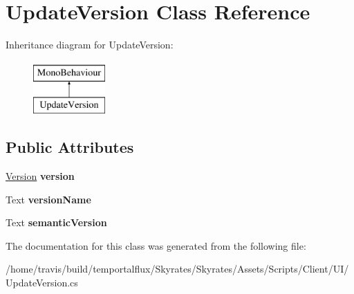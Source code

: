 \hypertarget{class_update_version}{\section{Update\-Version Class Reference}
\label{class_update_version}
}
Inheritance diagram for Update\-Version\-:\begin{figure}[H]
\begin{center}
\leavevmode
\includegraphics[height=2.000000cm]{class_update_version}
\end{center}
\end{figure}
\subsection*{Public Attributes}
\begin{DoxyCompactItemize}
\item 
\hypertarget{class_update_version_ab5d83ca9ce001faccea7812edc2a2943}{\hyperlink{class_version}{Version} {\bfseries version}}\label{class_update_version_ab5d83ca9ce001faccea7812edc2a2943}

\item 
\hypertarget{class_update_version_a809be7e3cb21e538344ba69ccd25b143}{Text {\bfseries version\-Name}}\label{class_update_version_a809be7e3cb21e538344ba69ccd25b143}

\item 
\hypertarget{class_update_version_aee0c34a0a9fcbddedfa907017202d8a4}{Text {\bfseries semantic\-Version}}\label{class_update_version_aee0c34a0a9fcbddedfa907017202d8a4}

\end{DoxyCompactItemize}


The documentation for this class was generated from the following file\-:\begin{DoxyCompactItemize}
\item 
/home/travis/build/temportalflux/\-Skyrates/\-Skyrates/\-Assets/\-Scripts/\-Client/\-U\-I/Update\-Version.\-cs\end{DoxyCompactItemize}
